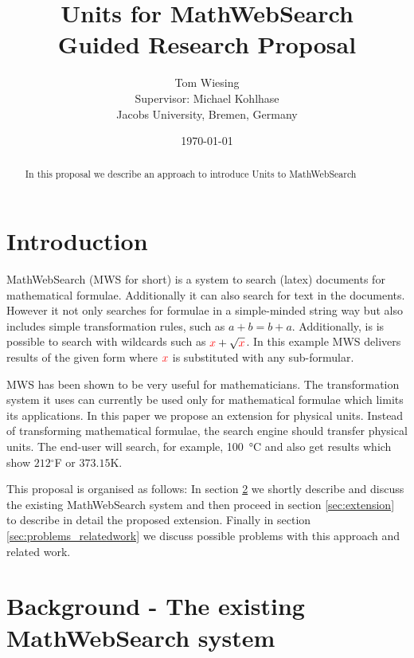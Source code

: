 \documentclass[11pt]{article}
\title{Units for MathWebSearch\ednote{Preliminary Title}\\ \vspace{2 mm} Guided Research Proposal}
\author{Tom Wiesing\\Supervisor: Michael Kohlhase\\Jacobs University, Bremen, Germany}
\date{\today}
\begin{document}
\maketitle

\begin{abstract}
  In this proposal we describe an approach to introduce Units to MathWebSearch
\end{abstract}

\section{Introduction}


MathWebSearch (MWS for short) is a system to search (latex) documents for mathematical formulae. Additionally it can also search for text in the documents. However it not only searches for formulae in a simple-minded string way but also includes simple transformation rules, such as $a + b = b + a$. Additionally, is is possible to search with wildcards such as $ { \color{red} x} + \sqrt{\color{red} x}$. In this example MWS delivers results of the given form where $\color{red} x$ is substituted with any sub-formular.

MWS has been shown to be very useful for mathematicians. The transformation system it uses can currently be used only for mathematical formulae which limits its applications. In this paper we propose an extension for physical units. Instead of transforming mathematical formulae, the search engine should transfer physical units.
The end-user will search, for example, \SI{100}{\degreeCelsius} and also get results which show $212$$^\circ$F or $373.15$K.

This proposal is organised as follows: In section \ref{sec:mws} we shortly describe and discuss the existing MathWebSearch system and then proceed in section \ref{sec:extension} to describe in detail the proposed extension. Finally in section \ref{sec:problems_relatedwork} we discuss possible problems with this approach and related work.

\section{Background - The existing MathWebSearch system}
\label{sec:mws}
\end{document}
